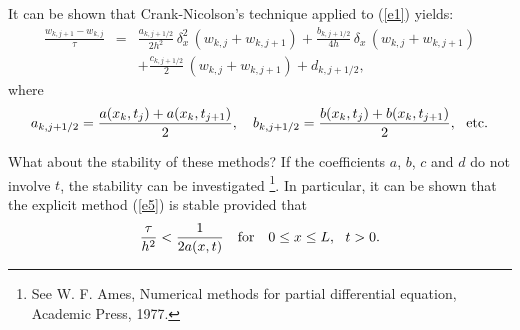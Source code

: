 It can be shown that Crank-Nicolson's technique applied to (\ref{e1}) yields:
\begin{eqnarray}
\frac{w_{k,j+1}-w_{k,j}}{\tau} &=& \frac{a_{k,j+1/2}}{2h^{2}} \,
\delta_{x}^2 \, \left(w_{k,j}+w_{k,j+1}\right)
+\frac{b_{k,j+1/2}}{4h} \, \delta_{x} \,  \left(w_{k,j}+w_{k,j+1}\right)\nonumber \\
&&+\frac{c_{k,j+1/2}}{2} \, \left(w_{k,j}+w_{k,j+1}\right)+d_{k,j+1/2}, \nonumber
\end{eqnarray}
where
\[
a_{k,j+1/2}=\frac{a(x_{k},t_{j})+a(x_{k},t_{j+1})}{2}, \quad
b_{k,j+1/2}=\frac{b(x_{k},t_{j})+b(x_{k},t_{j+1})}{2}, \ \ {\rm etc.}
\]
 
What about the stability of these methods?
If the coefficients $a$, $b$, $c$ and $d$ do not
involve $t$, the stability can be investigated
\footnote{See W. F. Ames, Numerical methods for partial differential equation,
Academic Press, 1977.}. In particular, it can be shown that the explicit method
(\ref{e5}) is stable provided that
\[
\frac{\tau}{h^2}<\frac{1}{2a(x,t)} \quad {\rm for} \quad 0\leq x\leq L, \ \ t>0.
\]


